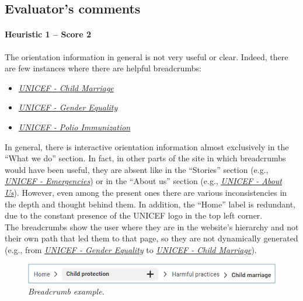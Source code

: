 \endgroup

\clearpage

\subsection*{Evaluator's comments}
\paragraph*{Heuristic 1 – Score 2}
The orientation information in general is not very useful or clear. Indeed, there are few instances where there are helpful breadcrumbs:
\begin{itemize}
	\item \textit{\href{https://www.unicef.org/protection/child-marriage}{UNICEF - Child Marriage}}
	\item \textit{\href{https://www.unicef.org/gender-equality}{UNICEF - Gender Equality}}
	\item \textit{\href{https://www.unicef.org/immunization/polio}{UNICEF - Polio Immunization}}
\end{itemize}

In general, there is interactive orientation information almost exclusively in the “What we do” section. In fact, in other parts of the site in which breadcrumbs would have been useful, they are absent like in the “Stories” section (e.g., \textit{\href{https://www.unicef.org/emergencies/13-emergencies-need-more-attention-support-2024}{UNICEF - Emergencies}}) or in the “About us” section (e.g., \textit{\href{https://www.unicef.org/about-us/75-years-unicef}{UNICEF - About Us}}).
However, even among the present ones there are various inconsistencies in the depth and thought behind them. In addition, the “Home” label is redundant, due to the constant presence of the UNICEF logo in the top left corner.\\
The breadcrumbs show the user where they are in the website’s hierarchy and not their own path that led them to that page, so they are not dynamically generated (e.g., from \textit{\href{https://www.unicef.org/gender-equality}{UNICEF - Gender Equality}} to \textit{\href{https://www.unicef.org/protection/child-marriage}{UNICEF - Child Marriage}}).

\begin{figure}[h]
	\includegraphics[width=\textwidth]{Picture1.png}
	\captionsetup{font=small}
	\caption{\textit{Breadcrumb example.}}
	\label{fig:label1}
\end{figure}


